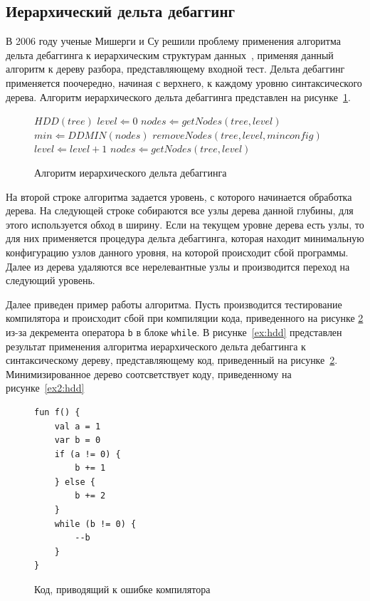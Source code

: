 \subsection{Иерархический дельта дебаггинг}
В 2006 году ученые Мишерги и Су решили проблему применения алгоритма дельта дебаггинга к иерархическим структурам данных~\cite{misherghi2006hdd}, применяя данный алгоритм к дереву разбора, представляющему входной тест. Дельта дебаггинг применяется поочередно, начиная с верхнего, к каждому уровню синтаксического дерева. Алгоритм иерархического дельта дебаггинга представлен на рисунке~\ref{alg:hdd}. 

\begin{figure}[h]
\begin{algorithmic}[1]
\STATE $HDD(tree)$
\STATE $level \Leftarrow 0$
\STATE $nodes \Leftarrow getNodes(tree, level)$
	\STATE $min \Leftarrow DDMIN(nodes)$
	\STATE $removeNodes(tree, level, minconfig)$
	\STATE $level \Leftarrow level + 1$
	\STATE $nodes \Leftarrow getNodes(tree, level)$
\ENDWHILE
\end{algorithmic}
\caption{Алгоритм иерархического дельта дебаггинга}
\label{alg:hdd}
\end{figure}

На второй строке алгоритма задается уровень, с которого начинается обработка дерева. На следующей строке собираются все узлы дерева данной глубины, для этого используется обход в ширину. Если на текущем уровне дерева есть узлы, то для них применяется процедура дельта дебаггинга, которая находит минимальную конфигурацию узлов данного уровня, на которой происходит сбой программы. Далее из дерева удаляются все нерелевантные узлы и производится переход на следующий уровень. 

Далее приведен пример работы алгоритма. Пусть производится тестирование компилятора и происходит сбой при компиляции кода, приведенного на рисунке \ref{ex1:hdd} из-за декремента оператора \texttt{b} в блоке \texttt{while}. В рисунке~\ref{ex:hdd} представлен результат применения алгоритма иерархического дельта дебаггинга к синтаксическому дереву, представляющему код, приведенный на рисунке~\ref{ex1:hdd}. Минимизированное дерево соотсветствует коду, приведенному на рисунке~\ref{ex2:hdd}
\begin{figure}
\begin{lstlisting}
fun f() {
    val a = 1
    var b = 0
    if (a != 0) {
        b += 1
    } else {
        b += 2
    }
    while (b != 0) {
        --b
    }
}
\end{lstlisting}
\caption{\label{ex1:hdd}Код, приводящий к ошибке компилятора}
\end{figure}



